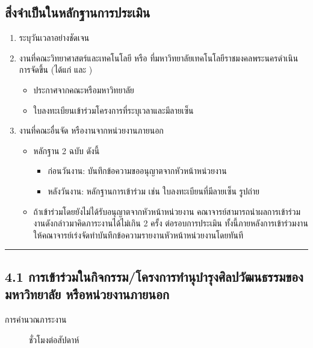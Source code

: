 \documentclass[a4paper,12pt,english]{sphinxmanual}
\begin{document}
\subsection{สิ่งจำเป็นในหลักฐานการประเมิน}
\label{\detokenize{workload_rubric:id75}}\begin{enumerate}
%
\item {} 
 ระบุวันเวลาอย่างชัดเจน

\item {} 
งานที่คณะวิทยาศาสตร์และเทคโนโลยี หรือ ที่มหาวิทยาลัยเทคโนโลยีราชมงคลพระนครดำเนินการจัดขึ้น (ได้แก่ {\hyperref[\detokenize{workload_rubric:id76}]{}} และ {\hyperref[\detokenize{workload_rubric:id85}]{}})
\begin{itemize}
\item {} 
ประกาศจากคณะหรือมหาวิทยาลัย 

\item {} 
ใบลงทะเบียนเข้าร่วมโครงการที่ระบุเวลาและมีลายเซ็น

\end{itemize}

\item {} 
งานที่คณะอื่นจัด หรืองานจากหน่วยงานภายนอก
\begin{itemize}
\item {} 
หลักฐาน 2 ฉบับ ดังนี้
\begin{itemize}
\item {} 
ก่อนวันงาน: บันทึกข้อความขออนุญาตจากหัวหน้าหน่วยงาน

\item {} 
หลังวันงาน: หลักฐานการเข้าร่วม เช่น ใบลงทะเบียนที่มีลายเซ็น รูปถ่าย

\end{itemize}

\item {} 
ถ้าเข้าร่วมโดยยังไม่ได้รับอนุญาตจากหัวหน้าหน่วยงาน คณาจารย์สามารถนำผลการเข้าร่วมงานดังกล่าวมาคิดภาระงานได้ไม่เกิน 2 ครั้ง ต่อรอบการประเมิน ทั้งนี้ภายหลังการเข้าร่วมงานให้คณาจารย์เร่งจัดทำบันทึกข้อความรายงานหัวหน้าหน่วยงานโดยทันที

\end{itemize}

\end{enumerate}


\bigskip\hrule\bigskip



\subsection{4.1 การเข้าร่วมในกิจกรรม/โครงการทำนุบำรุงศิลปวัฒนธรรมของมหาวิทยาลัย หรือหน่วยงานภายนอก}
\label{\detokenize{workload_rubric:id76}}\label{\detokenize{workload_rubric:id77}}\begin{description}
\item[{การคำนวณภาระงาน}]  ชั่วโมงต่อสัปดาห์

\end{description}
\end{document}
